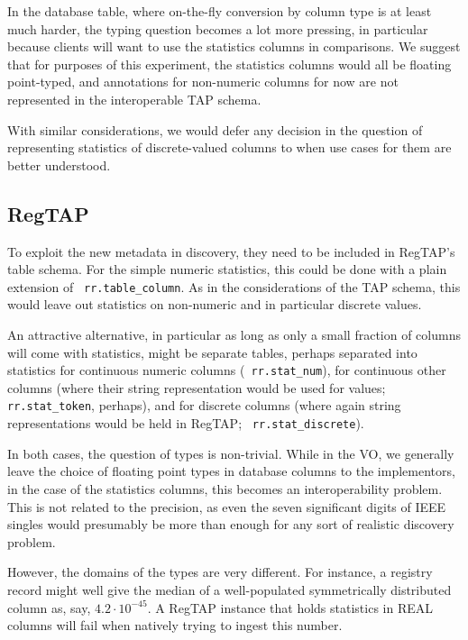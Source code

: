 \documentclass[11pt,a4paper]{ivoa}
\newcommand{\rtent}[1]{\texttt{\color{rtcolor} #1}}
\begin{document}
In the database table, where on-the-fly conversion by column type is at
least much harder, the typing question becomes a lot more pressing, in
particular because clients will want to use the statistics columns in
comparisons.  We
suggest that for purposes of this experiment, the statistics columns
would all be floating point-typed, and annotations for non-numeric
columns for now are not represented in the interoperable TAP schema.

With similar considerations, we would defer any decision in the question
of representing statistics of discrete-valued columns to when use cases
for them are better understood.

\subsection{RegTAP}

To exploit the new metadata in discovery, they need to be included in
RegTAP's table schema.  For the simple numeric statistics, this could be
done with a plain extension of \rtent{rr.table\_column}.  As in the
considerations of the TAP schema, this would leave out statistics on
non-numeric and in particular discrete values.

An attractive alternative, in particular as long as only a small
fraction of columns will come with statistics, might be separate tables,
perhaps separated into statistics for continuous numeric columns
(\rtent{rr.stat\_num}), for continuous other columns (where their string
representation would be used for values; \rtent{rr.stat\_token},
perhaps), and for discrete columns (where again string representations
would be held in RegTAP; \rtent{rr.stat\_discrete}).

In both cases, the question of types is non-trivial.  While in the VO,
we generally leave the choice of floating point types in database
columns to the implementors, in the case of the statistics columns,
this becomes an interoperability problem.  This is not related to the
precision, as even the seven significant digits of IEEE singles would
presumably be more than enough for any sort of realistic discovery
problem.

However, the domains of the types are very different.  For instance, a
registry record might well give the median of a well-populated
symmetrically distributed column as, say, $4.2\cdot 10^{-45}$.  A RegTAP
instance that holds statistics in REAL columns will fail when natively
trying to ingest this number.
\end{document}
